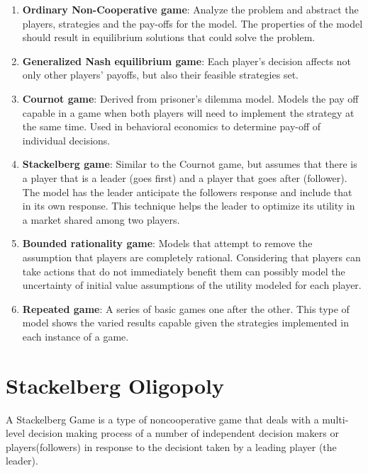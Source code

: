 \documentclass[phd, 12pt, print]{fauthesis}
\begin{document}
\begin{enumerate}
	\item \textbf{Ordinary Non-Cooperative game}: Analyze the problem and abstract the players,
	strategies and the pay-offs for the model. The properties of the model should 
	result in equilibrium solutions that could solve the problem.

	\item \textbf{Generalized Nash equilibrium game}: Each  player’s  decision affects 
	not only other players’ payoffs, but also their feasible strategies set.
	
	\item \textbf{Cournot game}: Derived from prisoner's dilemma model. Models the pay off  
	capable in a game when both players will need to implement the strategy at the
	same time. Used in behavioral economics to determine pay-off of individual decisions.
	
	\item \textbf{Stackelberg game}: Similar to the Cournot game, but assumes that there is a 
	player that is a leader (goes first) and a player that goes after (follower).
	The model has the leader anticipate the followers response and include that 
	in its own response. This technique helps the leader to optimize its utility
	in a market shared among two players.
	
	\item \textbf{Bounded rationality game}: Models that attempt to remove the assumption
	that players are completely rational. Considering that players can take
	actions that do not immediately benefit them can possibly model the 
	uncertainty of initial value assumptions of the utility modeled for each player.
	
	\item \textbf{Repeated game}: A series of basic games one after the other. This type of 
	model shows the varied results capable given the strategies implemented in 
	each instance of a game.
\end{enumerate}


\section{Stackelberg Oligopoly}
A Stackelberg Game is a type of noncooperative game that deals with a 
multi-level decision making process of a number of independent decision 
makers or players(followers) in response to the decisiont taken by a 
leading player (the leader).
\end{document}
